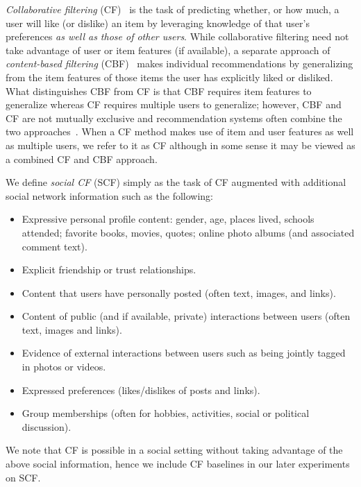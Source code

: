 \emph{Collaborative filtering} (CF)~\cite{collab_filtering} is the
task of predicting whether, or how much, a user will like (or dislike)
an item by leveraging knowledge of that user's preferences \emph{as
well as those of other users}.  While collaborative filtering need not
take advantage of user or item features (if available), a separate 
approach of \emph{content-based filtering} (CBF)~\cite{newsweeder}
makes individual recommendations by generalizing from the
item features of those items the user has
explicitly liked or disliked.
 What distinguishes
CBF from CF is that CBF requires item features to generalize whereas
CF requires multiple users to generalize; however,
CBF and CF are not mutually exclusive and recommendation systems often
combine the two approaches~\cite{fab}.   When a CF method makes use
of item and user features as well as multiple users, we refer to it as
CF although in some sense it may be viewed as a combined CF and CBF
approach.

We define \emph{social CF} (SCF) simply as the task of CF augmented
with additional social network information such as the following:
\begin{itemize}
\item Expressive personal profile content: gender, age, places lived, schools
attended; favorite books, movies, quotes; online photo albums (and associated comment text).
\item Explicit friendship or trust relationships.
\item Content that users have personally posted (often text, images, and links).
\item Content of public (and if available, private) interactions
between users (often text, images and links).
\item Evidence of external interactions between users such as being 
jointly tagged in photos or videos.
\item Expressed preferences (likes/dislikes of posts and links).
\item Group memberships (often for hobbies, activities, social or political discussion).
\end{itemize}
We note that CF is possible in a social setting without taking
advantage of the above social information, hence we include CF
baselines in our later experiments on SCF.  

